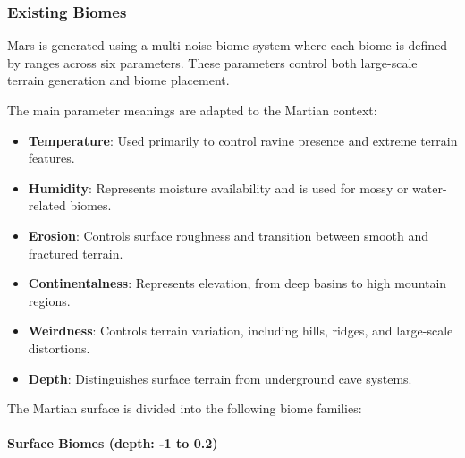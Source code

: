 \documentclass{article}
\begin{document}
\subsubsection{Existing Biomes}

Mars is generated using a multi-noise biome system where each biome is defined by ranges across six parameters. These parameters control both large-scale terrain generation and biome placement.

The main parameter meanings are adapted to the Martian context:

\begin{itemize}
    \item \textbf{Temperature}: Used primarily to control ravine presence and extreme terrain features.
    \item \textbf{Humidity}: Represents moisture availability and is used for mossy or water-related biomes.
    \item \textbf{Erosion}: Controls surface roughness and transition between smooth and fractured terrain.
    \item \textbf{Continentalness}: Represents elevation, from deep basins to high mountain regions.
    \item \textbf{Weirdness}: Controls terrain variation, including hills, ridges, and large-scale distortions.
    \item \textbf{Depth}: Distinguishes surface terrain from underground cave systems.
\end{itemize}

The Martian surface is divided into the following biome families:

\paragraph{Surface Biomes (depth: -1 to 0.2)}
\end{document}
